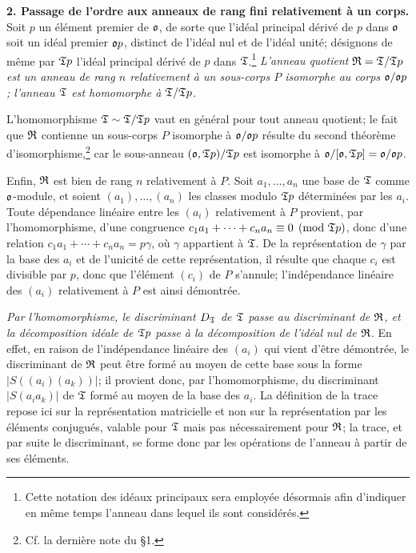 \textbf{2. Passage de l'ordre aux anneaux de rang fini relativement à un corps.} Soit $p$ un élément premier de $\mathfrak o$, de sorte que l'idéal principal dérivé de $p$ dans $\mathfrak o$ soit un idéal premier $\mathfrak o p$, distinct de l'idéal nul et de l'idéal unité; désignons de même par $\mathfrak T p$ l'idéal principal dérivé de $p$ dans $\mathfrak T$.\footnote{Cette notation des idéaux principaux sera employée désormais afin d'indiquer en même temps l'anneau dans lequel ils sont considérés.} \emph{L'anneau quotient $\mathfrak R=\mathfrak T/\mathfrak T p$ est un anneau de rang $n$ relativement à un sous-corps $P$ isomorphe au corps $\mathfrak o/\mathfrak o p$; l'anneau $\mathfrak T$ est homomorphe à $\mathfrak T/\mathfrak T p$.}

L'homomorphisme $\mathfrak T\sim\mathfrak T/\mathfrak T p$ vaut en général pour tout anneau quotient; le fait que $\mathfrak R$ contienne un sous-corps $P$ isomorphe à $\mathfrak o/\mathfrak o p$ résulte du second théorème d'isomorphisme,\footnote{Cf. la dernière note du \S 1.} car le sous-anneau $(\mathfrak o,\mathfrak T p)/\mathfrak T p$ est isomorphe à $\mathfrak o/[\mathfrak o,\mathfrak T p]=\mathfrak o/\mathfrak o p$.

Enfin, $\mathfrak R$ est bien de rang $n$ relativement à $P$. Soit $a_1,\ldots,a_n$ une base de $\mathfrak T$ comme $\mathfrak o$-module, et soient $(a_1),\ldots,(a_n)$ les classes modulo $\mathfrak T p$ déterminées par les $a_i$. Toute dépendance linéaire entre les $(a_i)$ relativement à $P$ provient, par l'homomorphisme, d'une congruence
$c_1a_1+\cdots+c_na_n\equiv0\pmod{\mathfrak T p}$,
donc d'une relation
$c_1a_1+\cdots+c_na_n=p\gamma$,
où $\gamma$ appartient à $\mathfrak T$. De la représentation de $\gamma$ par la base des $a_i$ et de l'unicité de cette représentation, il résulte que chaque $c_i$ est divisible par $p$, donc que l'élément $(c_i)$ de $P$ s'annule; l'indépendance linéaire des $(a_i)$ relativement à $P$ est ainsi démontrée.

\emph{Par l'homomorphisme, le discriminant $D_\mathfrak T$ de $\mathfrak T$ passe au discriminant de $\mathfrak R$, et la décomposition idéale de $\mathfrak T p$ passe à la décomposition de l'idéal nul de $\mathfrak R$.} En effet, en raison de l'indépendance linéaire des $(a_i)$ qui vient d'être démontrée, le discriminant de $\mathfrak R$ peut être formé au moyen de cette base sous la forme $|S((a_i)(a_k))|$; il provient donc, par l'homomorphisme, du discriminant $|S(a_i a_k)|$ de $\mathfrak T$ formé au moyen de la base des $a_i$. La définition de la trace repose ici sur la représentation matricielle et non sur la représentation par les éléments conjugués, valable pour $\mathfrak T$ mais pas nécessairement pour $\mathfrak R$; la trace, et par suite le discriminant, se forme donc par les opérations de l'anneau à partir de ses éléments.

